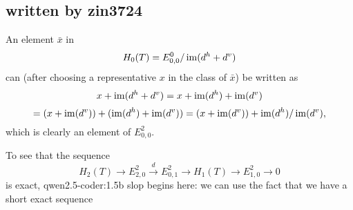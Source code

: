 \subsection{written by zin3724}
An element $\bar x$ in
\[H_0(T)=E^0_{0,0}/\im(d^h+d^v)\]
can (after choosing a representative $x$ in the class of $\bar x$) be written as
\[x+\im(d^h+d^v)=x+\im(d^h)+\im(d^v)\]
\[=(x+\im(d^v))+(\im(d^h)+\im(d^v))=(x+\im(d^v))+\im(d^h)/\im(d^v),\]
which is clearly an element of $E^2_{0,0}$.

To see that the sequence
\[H_2(T)\to E^2_{2,0}\overset{d}{\to} E^2_{0,1}\to H_1(T)\to E^2_{1,0}\to0\]
is exact, qwen2.5-coder:1.5b slop begins here: we can use the fact that we have a short exact sequence
